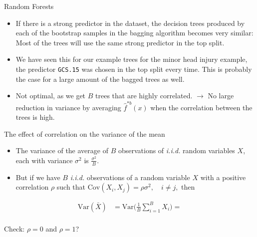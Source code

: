 \documentclass[
  10pt,
  ignorenonframetext,
]{beamer}
\providecommand{\tightlist}{%
  \setlength{\itemsep}{0pt}\setlength{\parskip}{0pt}}
\begin{document}
\begin{frame}[fragile]{Random Forests}
\protect\hypertarget{random-forests}{}
\(~\)

\begin{itemize}
\tightlist
\item
  If there is a strong predictor in the dataset, the decision trees
  produced by each of the bootstrap samples in the bagging algorithm
  becomes very similar: Most of the trees will use the same strong
  predictor in the top split.
\end{itemize}

\vspace{2mm}

\begin{itemize}
\tightlist
\item
  We have seen this for our example trees for the minor head injury
  example, the predictor \texttt{GCS.15} was chosen in the top split
  every time. This is probably the case for a large amount of the bagged
  trees as well.
\end{itemize}

\vspace{2mm}

\begin{itemize}
\tightlist
\item
  Not optimal, as we get \(B\) trees that are highly correlated.
  \(\rightarrow\) No large reduction in variance by averaging
  \(\hat{f}^{*b}(x)\) when the correlation between the trees is high.
\end{itemize}
\end{frame}

\begin{frame}
\begin{block}{The effect of correlation on the variance of the mean}
\protect\hypertarget{the-effect-of-correlation-on-the-variance-of-the-mean}{}
\vspace{3mm}

\begin{itemize}
\item
  The variance of the average of \(B\) observations of \emph{i.i.d.}
  random variables \(X\), each with variance \(\sigma^2\) is
  \(\frac{\sigma^2}{B}\).
\item
  But if we have \(B\) \emph{i.i.d.} observations of a random variable
  \(X\) with a positive correlation \(\rho\) such that
  \(\text{Cov}(X_i, X_j) = \rho \sigma^2, \quad i \neq j,\) then
\end{itemize}

\vspace{-3mm}

\[ \begin{aligned} \text{Var}(\bar{X}) &= \text{Var}\Big( \frac{1}{B}\sum_{i=1}^B X_i \Big) =\\
\end{aligned}\]

\vspace{35mm}

\vspace{1mm}

Check: \(\rho=0\) and \(\rho=1\)?
\end{block}
\end{frame}
\end{document}
